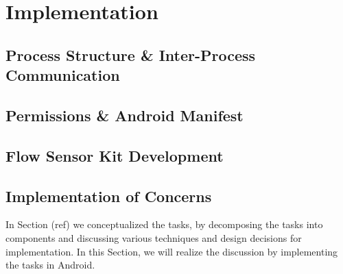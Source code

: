 \chapter{Implementation}

%

\section{Process Structure \& Inter-Process Communication}
\section{Permissions \& Android Manifest}

\section{Flow Sensor Kit Development}


\section{Implementation of Concerns}
In Section (ref) we conceptualized the tasks, by decomposing the tasks into components and discussing various techniques and design decisions for implementation. In this Section, we will realize the discussion by implementing the tasks in Android. 



